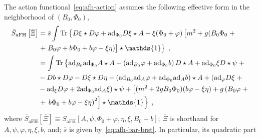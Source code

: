 \documentclass[../main.tex]{subfiles}
\begin{document}
The action functional~\eqref{eq:afh-action} assumes the following effective form in the neighborhood of $(B_0, \Phi_0)$,
\begin{subequations}%
  \label{eq:afh-eff-action}
  \begin{align}%
    \bar{S}_{\text{aFH}} \left[ \bar{\Xi} \right] & = \bar{s} \int \tr \left\{ D \xi \star D\varphi + \mathrm{ad}_{\Phi_0} D \xi \star A + \xi ( \Phi_0 + \varphi ) \left[ m^2 + g ( B_0 \Phi_0 \right. + \right.                                                      \nonumber   \\
                                                                                                                                                                      & \left. + \left.  B_0 \varphi + b \Phi_0 + b \varphi - \xi \eta ) \vphantom{m^2} \right] \star \mathds{1} \right\}     \;,                \label{eq:afh-eff-action-exact} \\
                                                  & = \int \tr \left\{ \vphantom{m^2} \mathrm{ad}_{B_0} \mathrm{ad}_{\Phi_0} A \star A + \left( \mathrm{ad}_{B_0} \varphi + \mathrm{ad}_{\Phi_0} b \right) D \star A  + \mathrm{ad}_{\Phi_0} \xi D \star \psi \right. +  \nonumber                                                               \\
                                                  & - Db \star D \varphi - D \xi \star D \eta - \left( \mathrm{ad}_{B_0} \mathrm{ad}_{A} \varphi + \mathrm{ad}_{\Phi_0} \mathrm{ad}_{A} b \right) \star A + ( \mathrm{ad}_{\varphi} D \xi \; +  \nonumber                                                                                        \\
                                                  & - \mathrm{ad}_{\xi} D \varphi + 2 \mathrm{ad}_{\Phi_0}\mathrm{ad}_{A} \xi ) \star \psi + \left[ ( m^2 + 2g B_0 \Phi_0 ) ( b \varphi - \xi \eta ) + g \left( B_0 \varphi \right. + \right. \nonumber                            \\
                                                                                                                                               & \left. + \left. \left.  b \Phi_0 + b \varphi - \xi \eta \right)^2 \right] \star \mathds{1} \right\} \;, \label{eq:afh-eff-action-full}                                                          %
  \end{align}
\end{subequations}
where $\bar{S}_{\text{aFH}} [ \bar{\Xi} ] \equiv S_{\text{aFH}} [A, \psi, \Phi_0 + \varphi, \eta, \xi, B_0 + b]$; $\bar{\Xi}$ is shorthand for $A, \psi, \varphi, \eta, \xi, b$, and; $\bar{s}$ is given by~\eqref{eq:afh-bar-brst}. In particular, its quadratic part
\end{document}
